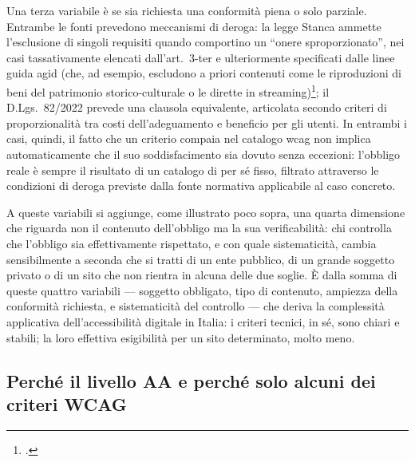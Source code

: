 Una terza variabile è se sia richiesta una conformità piena o solo parziale. Entrambe le fonti prevedono meccanismi di deroga: la legge Stanca ammette l'esclusione di singoli requisiti quando comportino un \enquote{onere sproporzionato}, nei casi tassativamente elencati dall'art.~3-ter e ulteriormente specificati dalle linee guida \gls{agid} (che, ad esempio, escludono a priori contenuti come le riproduzioni di beni del patrimonio storico-culturale o le dirette in streaming)\footcite[§~6.1.4]{agid:lg-stanca}; il D.Lgs.~82/2022 prevede una clausola equivalente, articolata secondo criteri di proporzionalità tra costi dell'adeguamento e beneficio per gli utenti. In entrambi i casi, quindi, il fatto che un criterio compaia nel catalogo \gls{wcag} non implica automaticamente che il suo soddisfacimento sia dovuto senza eccezioni: l'obbligo reale è sempre il risultato di un catalogo di per sé fisso, filtrato attraverso le condizioni di deroga previste dalla fonte normativa applicabile al caso concreto.

A queste variabili si aggiunge, come illustrato poco sopra, una quarta dimensione che riguarda non il contenuto dell'obbligo ma la sua verificabilità: chi controlla che l'obbligo sia effettivamente rispettato, e con quale sistematicità, cambia sensibilmente a seconda che si tratti di un ente pubblico, di un grande soggetto privato o di un sito che non rientra in alcuna delle due soglie. È dalla somma di queste quattro variabili --- soggetto obbligato, tipo di contenuto, ampiezza della conformità richiesta, e sistematicità del controllo --- che deriva la complessità applicativa dell'accessibilità digitale in Italia: i criteri tecnici, in sé, sono chiari e stabili; la loro effettiva esigibilità per un sito determinato, molto meno.


\subsection{Perché il livello AA e perché solo alcuni dei criteri WCAG}
\label{subsec:livello-aa}

